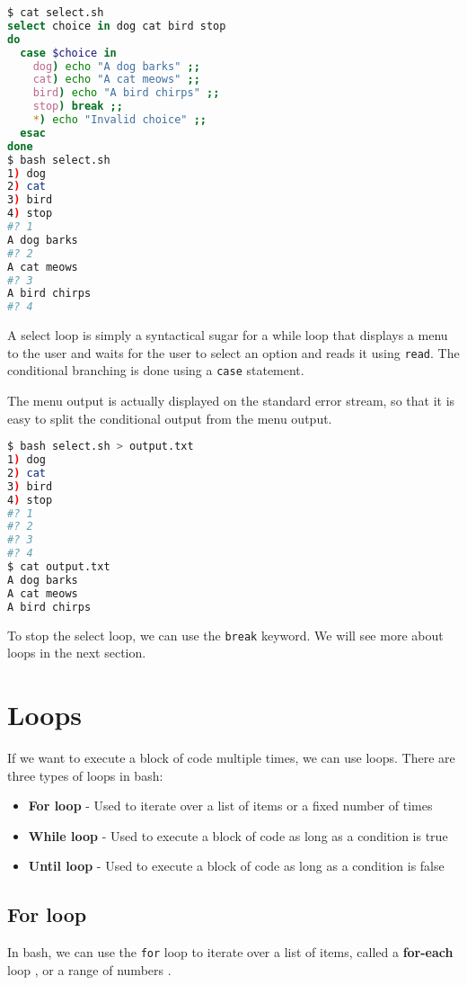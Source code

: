 \begin{lstlisting}[language=bash]
$ cat select.sh
select choice in dog cat bird stop
do
  case $choice in
    dog) echo "A dog barks" ;;
    cat) echo "A cat meows" ;;
    bird) echo "A bird chirps" ;;
    stop) break ;;
    *) echo "Invalid choice" ;;
  esac
done
$ bash select.sh
1) dog
2) cat
3) bird
4) stop
#? 1
A dog barks
#? 2
A cat meows
#? 3
A bird chirps
#? 4
\end{lstlisting}

A select loop is simply a syntactical sugar for a while loop that displays a menu to the user and waits for the user to select an option and reads it using \lstinline|read|.
The conditional branching is done using a \lstinline|case| statement.

The menu output is actually displayed on the standard error stream, so that it is easy to split the conditional output from the menu output.

\begin{lstlisting}[language=bash]
$ bash select.sh > output.txt
1) dog
2) cat
3) bird
4) stop
#? 1
#? 2
#? 3
#? 4
$ cat output.txt
A dog barks
A cat meows
A bird chirps
\end{lstlisting}

To stop the select loop, we can use the \lstinline|break| keyword.
We will see more about loops in the next section.

\section{Loops}

If we want to execute a block of code multiple times, we can use loops. There are three types of loops in bash:

\begin{itemize}
    \item \textbf{For loop} - Used to iterate over a list of items or a fixed number of times
    \item \textbf{While loop} - Used to execute a block of code as long as a condition is true
    \item \textbf{Until loop} - Used to execute a block of code as long as a condition is false
\end{itemize}

\subsection{For loop}

In bash, we can use the \lstinline{for} loop to iterate over a list of items,
called a \textbf{for-each} loop
, or a range of numbers
.

